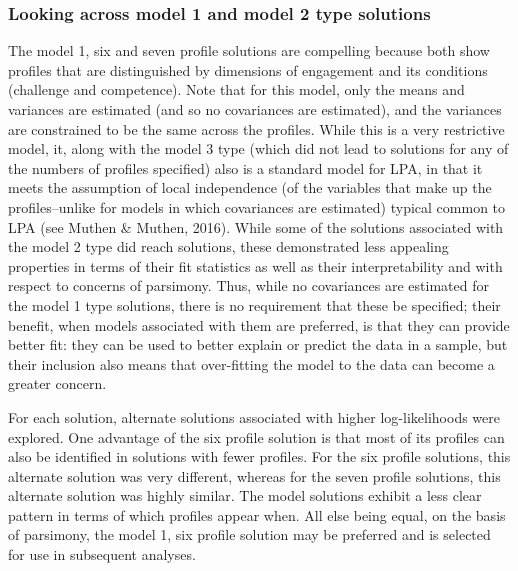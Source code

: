 \documentclass[]{book}
\theoremstyle{definition}
\theoremstyle{definition}
\theoremstyle{definition}
\theoremstyle{remark}
\begin{document}
\subsubsection{Looking across model 1 and model 2 type
solutions}\label{looking-across-model-1-and-model-2-type-solutions}

The model 1, six and seven profile solutions are compelling because both
show profiles that are distinguished by dimensions of engagement and its
conditions (challenge and competence). Note that for this model, only
the means and variances are estimated (and so no covariances are
estimated), and the variances are constrained to be the same across the
profiles. While this is a very restrictive model, it, along with the
model 3 type (which did not lead to solutions for any of the numbers of
profiles specified) also is a standard model for LPA, in that it meets
the assumption of local independence (of the variables that make up the
profiles--unlike for models in which covariances are estimated) typical
common to LPA (see Muthen \& Muthen, 2016). While some of the solutions
associated with the model 2 type did reach solutions, these demonstrated
less appealing properties in terms of their fit statistics as well as
their interpretability and with respect to concerns of parsimony. Thus,
while no covariances are estimated for the model 1 type solutions, there
is no requirement that these be specified; their benefit, when models
associated with them are preferred, is that they can provide better fit:
they can be used to better explain or predict the data in a sample, but
their inclusion also means that over-fitting the model to the data can
become a greater concern.

For each solution, alternate solutions associated with higher
log-likelihoods were explored. One advantage of the six profile solution
is that most of its profiles can also be identified in solutions with
fewer profiles. For the six profile solutions, this alternate solution
was very different, whereas for the seven profile solutions, this
alternate solution was highly similar. The model solutions exhibit a
less clear pattern in terms of which profiles appear when. All else
being equal, on the basis of parsimony, the model 1, six profile
solution may be preferred and is selected for use in subsequent
analyses.
\end{document}

